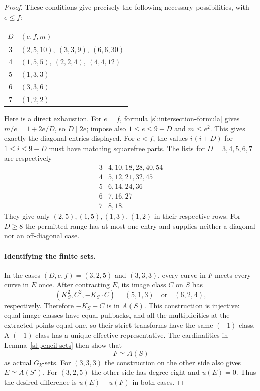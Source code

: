 \begin{proof}
These conditions give precisely the following necessary possibilities,
with $e\leq f$:
\begin{center}
\begin{tabular}{@{}cl@{}}
\toprule
$D$&$(e,f,m)$\\
\midrule
3&$(2,5,10),\ (3,3,9),\ (6,6,30)$\\
4&$(1,5,5),\ (2,2,4),\ (4,4,12)$\\
5&$(1,3,3)$\\
6&$(3,3,6)$\\
7&$(1,2,2)$\\
\bottomrule
\end{tabular}
\end{center}
Here is a direct exhaustion.  For $e=f$, formula
\eqref{sl:intersection-formula} gives $m/e=1+2e/D$, so $D\mid2e$;
impose also $1\leq e\leq9-D$ and $m\leq e^2$.  This gives exactly
the diagonal entries displayed.  For $e<f$, the values $i(i+D)$ for
$1\leq i\leq9-D$ must have matching squarefree parts.  The lists for
$D=3,4,5,6,7$ are respectively
\[
\begin{array}{c|l}
3&4,10,18,28,40,54\\
4&5,12,21,32,45\\
5&6,14,24,36\\
6&7,16,27\\
7&8,18.
\end{array}
\]
They give only $(2,5),(1,5),(1,3),(1,2)$ in their respective rows.
For $D\geq8$ the permitted range has at most one entry and supplies
neither a diagonal nor an off-diagonal case.

\paragraph{Identifying the finite sets.}
In the cases $(D,e,f)=(3,2,5)$ and $(3,3,3)$, every curve in $F$ meets
every curve in $E$ once.  After contracting $E$, its image class $C$
on $S$ has
\[
 (K_S^2,C^2,-K_S\cdot C)=(5,1,3)
 \quad\text{or}\quad(6,2,4),
\]
respectively.  Therefore $-K_S-C$ is in $A(S)$.  This construction is
injective: equal image classes have equal pullbacks, and all the
multiplicities at the extracted points equal one, so their strict
transforms have the same $(-1)$ class.  A $(-1)$ class has a unique
effective representative.  The cardinalities in Lemma~\ref{sl:pencil-sets}
then show that
\[
 F\simeq A(S)
\]
as actual $G_k$-sets.  For $(3,3,3)$ the construction on the other
side also gives $E\simeq A(S')$.  For $(3,2,5)$ the other side has
degree eight and $u(E)=0$.  Thus the desired difference is $u(E)-u(F)$
in both cases.


\end{proof}
